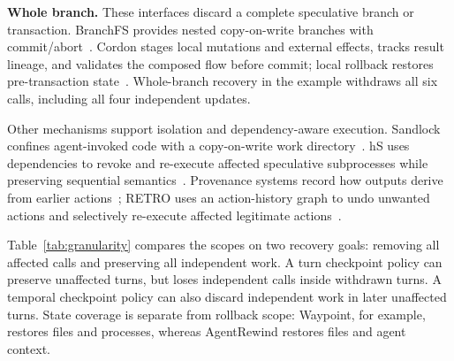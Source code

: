 \textbf{Whole branch.}
These interfaces discard a complete speculative branch or transaction.
BranchFS provides nested copy-on-write branches with commit/abort~\cite{branchfs}.
Cordon stages local mutations and external effects, tracks result lineage,
and validates the composed flow before commit; local rollback restores
pre-transaction state~\cite{cordon}. Whole-branch recovery in the example
withdraws all six calls, including all four independent updates.

Other mechanisms support isolation and dependency-aware execution.
Sandlock confines agent-invoked code with a copy-on-write work
directory~\cite{sandlock}. hS uses dependencies to revoke and re-execute
affected speculative subprocesses while preserving sequential
semantics~\cite{hs-osdi26}. Provenance systems record how outputs derive
from earlier actions~\cite{pass,beep}; RETRO uses an action-history graph
to undo unwanted actions and selectively re-execute affected legitimate
actions~\cite{retro}.

Table~\ref{tab:granularity} compares the scopes on two recovery goals:
removing all affected calls and preserving all independent work. A turn
checkpoint policy can preserve unaffected turns, but loses independent
calls inside withdrawn turns. A temporal checkpoint policy can also
discard independent work in later unaffected turns. State coverage is
separate from rollback scope:
Waypoint, for example, restores files and processes, whereas AgentRewind
restores files and agent context.

